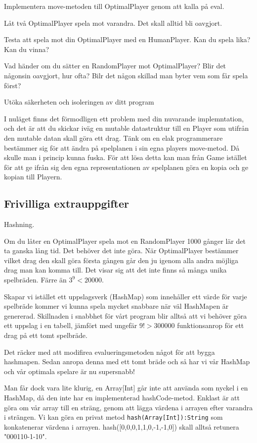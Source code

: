 \Subtask Implementera move-metoden till OptimalPlayer genom att kalla på eval.

\Subtask Låt två OptimalPlayer spela mot varandra. Det skall alltid bli oavgjort.

\Subtask Testa att spela mot din OptimalPlayer med en HumanPlayer. Kan du spela lika? Kan du vinna?

\Subtask Vad händer om du sätter en RandomPlayer mot OptimalPlayer? Blir det någonsin oavgjort, hur ofta? Bilr det någon skillad man byter vem som får spela först?

\Task Utöka säkerheten och isoleringen av ditt program

I nuläget finns det förmodligen ett problem med din nuvarande implemntation, och det är att du skickar iväg en mutable datastruktur till en Player som utifrån den mutable datan skall göra ett drag. Tänk om en elak programmerare bestämmer sig för att ändra på spelplanen i sin egna players move-metod. Då skulle man i princip kunna fuska. För att lösa detta kan man från Game istället för att ge ifrån sig den egna representationen av spelplanen göra en kopia och ge kopian till Playern.

\subsection{Frivilliga extrauppgifter}

\Task Hashning.

Om du låter en OptimalPlayer spela mot en RandomPlayer 1000 gånger lär det ta ganska lång tid. Det behöver det inte göra. När OptimalPlayer bestämmer vilket drag den skall göra första gången går den ju igenom alla andra möjliga drag man kan komma till. Det visar sig att det inte finns så många unika spelbräden. Färre än $3^9 < 20000$. 

Skapar vi istället ett uppslagsverk (HashMap) som innehåller ett värde för varje spelbräde kommer vi kunna spela mycket snabbare när väl HashMapen är genererad. Skillnaden i snabbhet för vårt program blir alltså att vi behöver göra ett uppslag i en tabell, jämfört med ungefär $9! > 300000$ funktionsanrop för ett drag på ett tomt spelbräde. 

Det räcker med att modifirea evalueringsmetoden något för att bygga hashmapen. Sedan anropa denna med ett tomt bräde och så har vi vår HashMap och vår optimala spelare är nu supersnabb!

Man får dock vara lite klurig, en Array[Int] går inte att använda som nyckel i en HashMap, då den inte har en implementerad hashCode-metod. Enklast är att göra om vår array till en sträng, genom att lägga värdena i arrayen efter varandra i strängen. Vi kan göra en privat metod \texttt{hash(Array[Int]):String} som konkatenerar värdena i arrayen. hash([0,0,0,1,1,0,-1,-1,0]) skall alltså retunera "000110-1-10".

